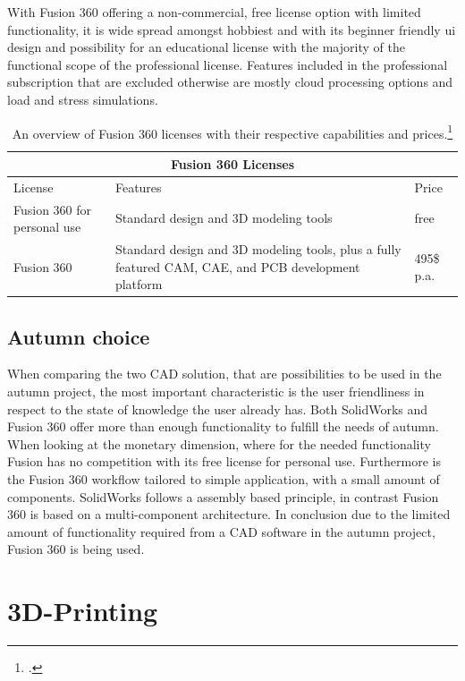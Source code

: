 With Fusion 360 offering a non-commercial, free license option with limited functionality, it is wide spread amongst hobbiest and with its beginner friendly ui design and possibility for an educational license with the majority of the functional scope of the professional license. Features included in the professional subscription that are excluded otherwise are mostly cloud processing options and load and stress simulations.

\begin{table}
	\centering
	\begin{tabular}{ |p{3cm}||p{6cm}|p{3cm}|  }
		\hline
		\multicolumn{3}{|c|}{Fusion 360 Licenses} \\
		\hline
		License & Features & Price\\
		\hline
		Fusion 360 for personal use& Standard design and 3D modeling tools& free\\
		\hline
		Fusion 360& Standard design and 3D modeling tools, plus a fully featured CAM, CAE, and PCB development platform& 495\$ p.a.\\
		\hline
	\end{tabular}
	\caption{An overview of Fusion 360 licenses with their respective capabilities and prices.\footcite{autodeskFusionPersonalNoDate}}
\end{table}

\subsection{Autumn choice}

When comparing the two CAD solution, that are possibilities to be used in the autumn project, the most important characteristic is the user friendliness in respect to the state of knowledge the user already has. Both SolidWorks and Fusion 360 offer more than enough functionality to fulfill the needs of autumn. When looking at the monetary dimension, where for the needed functionality Fusion has no competition with its free license for personal use. Furthermore is the Fusion 360 workflow tailored to simple application, with a small amount of components. SolidWorks follows a assembly based principle, in contrast Fusion 360 is based on a multi-component architecture.\newline
In conclusion due to the limited amount of functionality required from a CAD software in the autumn project, Fusion 360 is being used.

\section{3D-Printing}

